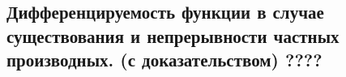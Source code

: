 {
\subsection{Дифференцируемость функции в случае существования и непрерывности частных производных. (с доказательством) ????}
}